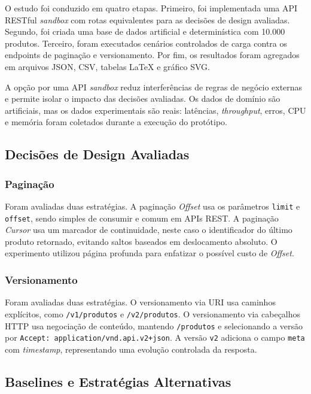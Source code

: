\documentclass[journal]{IEEEtran}
\begin{document}
O estudo foi conduzido em quatro etapas. Primeiro, foi implementada uma API RESTful \textit{sandbox} com rotas equivalentes para as decisões de design avaliadas. Segundo, foi criada uma base de dados artificial e determinística com 10.000 produtos. Terceiro, foram executados cenários controlados de carga contra os endpoints de paginação e versionamento. Por fim, os resultados foram agregados em arquivos JSON, CSV, tabelas LaTeX e gráfico SVG.

A opção por uma API \textit{sandbox} reduz interferências de regras de negócio externas e permite isolar o impacto das decisões avaliadas. Os dados de domínio são artificiais, mas os dados experimentais são reais: latências, \textit{throughput}, erros, CPU e memória foram coletados durante a execução do protótipo.

\subsection{Decisões de Design Avaliadas}

\subsubsection{Paginação}

Foram avaliadas duas estratégias. A paginação \textit{Offset} usa os parâmetros \texttt{limit} e \texttt{offset}, sendo simples de consumir e comum em APIs REST. A paginação \textit{Cursor} usa um marcador de continuidade, neste caso o identificador do último produto retornado, evitando saltos baseados em deslocamento absoluto. O experimento utilizou página profunda para enfatizar o possível custo de \textit{Offset}.

\subsubsection{Versionamento}

Foram avaliadas duas estratégias. O versionamento via URI usa caminhos explícitos, como \texttt{/v1/produtos} e \texttt{/v2/produtos}. O versionamento via cabeçalhos HTTP usa negociação de conteúdo, mantendo \texttt{/produtos} e selecionando a versão por \texttt{Accept: application/vnd.api.v2+json}. A versão \texttt{v2} adiciona o campo \texttt{meta} com \textit{timestamp}, representando uma evolução controlada da resposta.

\subsection{Baselines e Estratégias Alternativas}
\end{document}

